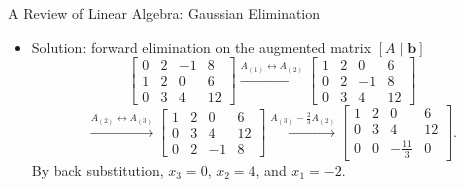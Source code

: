 \documentclass[aspectratio=169,hyperref,UTF8,CJK]{beamer}
\newcommand{\vect}[1]{\boldsymbol{#1}}
\begin{document}
\begin{frame}{A Review of Linear Algebra: Gaussian Elimination}
  \small
  \begin{itemize}
    \item Solution: forward elimination on the augmented matrix $[A\mid\vect{b}]$
      \begin{equation*}
        \begin{bmatrix}0&2&-1&8\\1&2&0&6\\0&3&4&12\end{bmatrix}
        \xrightarrow{A_{(1)}\leftrightarrow A_{(2)}}
        \begin{bmatrix}1&2&0&6\\0&2&-1&8\\0&3&4&12\end{bmatrix}
      \end{equation*}
      \begin{equation*}
        \xrightarrow{A_{(2)}\leftrightarrow A_{(3)}}
        \begin{bmatrix}1&2&0&6\\0&3&4&12\\0&2&-1&8\end{bmatrix}
        \xrightarrow{A_{(3)}-\frac23A_{(2)}}
        \begin{bmatrix}1&2&0&6\\0&3&4&12\\0&0&-\frac{11}{3}&0\end{bmatrix}.
      \end{equation*}
      By back substitution, $x_3=0$, $x_2=4$, and $x_1=-2$.
  \end{itemize}
\end{frame}
\end{document}
